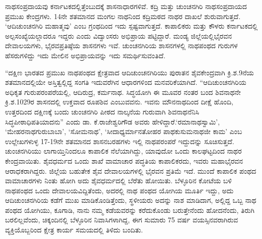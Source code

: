 ನಾಥಸಂಪ್ರದಾಯವು ಕರ್ನಾಟಕದಲ್ಲಿತ್ತೆಂಬುದಕ್ಕೆ ಶಾಸನಾಧಾರಗಳಿವೆ. ಕದ್ರಿ ಮತ್ತು ಚುಂಚನಗಿರಿ ನಾಥ\break ಸಂಪ್ರದಾಯದ ಪ್ರಮುಖ ಕೇಂದ್ರಗಳು. 14ನೇ ಶತಮಾನದ ಮಂಗಲ ನಾಥನಿಂದ ಕದ್ರಿಮಠದ ನಾಥರ ದಾಖಲೆ ಶುರುವಾಗುತ್ತದೆ. ‘ಆದಿಚುಂಚನಗಿರಿ ಮಹಾತ್ಮವು’ ಎಂಬ ಗ್ರಂಥದಿಂದ ಇದು ಸ್ಪಷ್ಟವಾಗುತ್ತದೆ. ಕಾಪಾಲಿಕರು ಮತ್ತು ಕೌಳರು ಕರ್ನಾಟಕದಲ್ಲಿ ಅಲ್ಪಸಂಖ್ಯೆಯಲ್ಲಾದರೂ ಇದ್ದರು ಎಂದು ವಿದ್ವಾಂಸರು ಅಭಿಪ್ರಾಯ ಪಟ್ಟಿದ್ದಾರೆ. ಮಂಡ್ಯ ಜಿಲ್ಲೆಯಲ್ಲಿ\break ಭೈರವನ ದೇವಾಲಯಗಳು, ಭೈರವಪ್ರತಿಷ್ಠೆಯ ಶಾಸನಗಳು ಇವೆ. ಚುಂಚನಗಿರಿಯ ಶಾಸನಗಳಲ್ಲಿ ನಾಥಪಂಥದ ಗುರುಗಳ ಹೆಸರುಗಳಿದ್ದು ಇದು ಮೇಲಿನ ಅಭಿಪ್ರಾಯವನ್ನು ಇದು ಸಮರ್ಥಿಸುವಂತಿದೆ.

“ದಕ್ಷಿಣ ಭಾರತದ ಪ್ರಮುಖ ನಾಥಪಂಥದ ಕ್ಷೇತ್ರವಾದ ಆದಿಚುಂಚನಗಿರಿಯು ಪುರಾತನ ಶೈವಕೇಂದ್ರವಾಗಿ ಕ್ರಿ.ಶ.9ನೆಯ ಶತಮಾನದಲ್ಲಿಯೇ ಅಸ್ತಿತ್ವಲ್ಲಿದ್ದ ಸಂಗತಿ ಇದುವರೆಗಿನ ಆಧಾರಗಳಿಂದ ಮನವರಿಕೆಯಾಗಿದೆ. “ಆದಿಚುಂಚನಗಿರಿಯ ಅಧಿಕೃತ ಗುರುಪರಂಪರೆಯಲ್ಲಿ, ಆದಿರುದ್ರ, ಕರ್ಮನಾಥ. ಸಿದ್ಧಯೋಗಿ ಈ ಮೂವರ ನಂತರ ಬಂದ ಶಿವನಾಥನೇ ಕ್ರಿ.ಶ.1029ರ ಶಾಸನದಲ್ಲಿ ಉಕ್ತವಾದ ರೂಪಶಿವ ಎಂಬುವವನು. ಇವನು ಮೌನನಾಥದಿಂದ ದೀಕ್ಷೆ ಹೊಂದಿ, ಉತ್ತರದಿಂದ ದಕ್ಷಿಣಕ್ಕೆ ಬಂದು ಚುಂಚನಗಿರಿ ಪೀಠದ ನಾಲ್ಕನೆಯ ಗುರುವಾಗಿ ಶಿವನಾಥನೆನಿಸಿ ಸಿದ್ಧಪೀಠಾಧಿಪತಿಯಾದನು” ಎಂದು ಡಾ. ಕೆ.ರಾಜೇಶ್ವರಿಗೌಡ ಅವರು ಹೇಳಿದ್ದಾರೆ.‘ರಮಾನಾಥಸ್ವಾಮಿ’, ‘ಮೇಹರನಾಥಗುರುಬಾಬಾ’, ‘ಸೋಮನಾಥ’, ‘ಸೀದಾಧ್ಯರ್ಮಾನತೋಹರ ಪಾಥಕುಸುಮನಾಥಜೀ ಕಾಮ’ ಎಂಬ ಉಲ್ಲೇಖಗಳುಳ್ಳ 17-19ನೇ ಶತಮಾನದ ಶಾಸನಬರಹಗಳು ಇಲ್ಲಿ ನಾಥಪರಂಪರೆ ಇದ್ದುದನ್ನು ಸೂಚಿಸುತ್ತದೆ. ಚುಂಚನಗಿರಿಯು ಲಾಗಾಯ್ತಿನಿಂದಲೂ ಕಾಪಾಲಿಕ ನೆಲೆಯಾಗಿದ್ದು, ಯಾವುದೋ ಒಂದು ಕಾಲಘಟ್ಟದಿಂದ ನಾಥರ ಕೇಂದ್ರವಾಯಿತು. ಶೈವಧರ್ಮದ ಒಂದು ಶಾಖೆ ವಾಮಾಚಾರ ಪದ್ಧತಿಯ ಕಾಪಾಲಿಕರದು, ಇವರು ಮಹಾಭೈರವನ ಆರಾಧಕರಾಗಿದ್ದರು. ಜಿಲ್ಲೆಯ ಬಹುತೇಕ ಶೈವ ದೇವಾಲಯಗಳಲ್ಲಿ ಭೈರವನ ಪ್ರತಿಮೆ ಇದೆ. ಮುಂದೆ ಕಾಪಾಲಿಕ ಪಂಥದ ವಾಮಾಚಾರಗಳು ನಿಂತು ಹೋಗಿ ಅದು ಶೈವಧರ್ಮದಲ್ಲಿ ಬೆರೆತು ಹೋಯಿತು. ಬೆಳ್ಳೂರಿನ ಕೋಟೆಯ ಬಳಿ ನಾಥಪಂಥದ ಒಂದು ದೇವಾಲಯವಿದ್ದಿತೆಂದು, ಅದರಲ್ಲಿ ನಾಥ ಪಂಥದ ಯೋಗಿಯ ಮೂರ್ತಿ ಇದ್ದು, ಅದು ಆದಿಚುಂಚನಗಿರಿಯ ಕಡೆಗೆ ಮುಖ ಮಾಡಿಕೊಂಡಿತ್ತೆಂದು, ಸ್ಥಳೀಯರು ಅದನ್ನು ನಾಶ ಮಾಡಿದಾಗ, ಅಲ್ಲಿದ್ದ ಒಬ್ಬ ನಾಥ ಪಂಥದ ಯೋಗಿಯು, ಕೂಗಾಡಿ, ನಾನು ನಮ್ಮ ಕಡೆಯವರನ್ನು ಕರೆದುಕೊಂಡು ಬರುತ್ತೇನೆಂದು ಹೋದನೆಂದು, ತಿರುಗಿ ಬರಲಿಲ್ಲವೆಂದು, ಚಿಕ್ಕಂದಿನಲ್ಲಿ ಬೆಳ್ಳೂರಿನ ನಿವಾಸಿಗಳಾಗಿದ್ದ, ಈಗ ಸುಮಾರು 75 ವರ್ಷ ವಯಸ್ಸಿನವರಾಗಿರುವ ವ್ಯಕ್ತಿಯೊಬ್ಬರಿಂದ ಕ್ಷೇತ್ರ ಕಾರ್ಯ ಸಮಯದಲ್ಲಿ ತಿಳಿದು ಬಂದಿತು.

